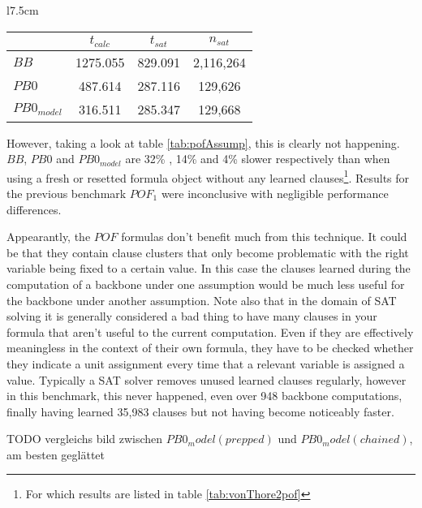 \begin{wraptable}{l}{7.5cm}
\begin{tabular}{l| c c  c}
& $t_{calc}$ & $t_{sat}$ &  $n_{sat}$ \\
\hline
$BB$ & 1275.055 & 829.091 &  2,116,264 \\
$PB0$ & 487.614 & 287.116 &  129,626 \\
$PB0_{model}$ & 316.511 & 285.347 & 129,668 \\
\end{tabular}
\caption{Results with assumptions instead of formula modification}
\label{tab:pofAssump}
\end{wraptable}

However, taking a look at table \ref{tab:pofAssump}, this is clearly not happening. $BB$, $PB0$ and $PB0_{model}$ are 32\% , 14\% and 4\% slower respectively than when using a fresh or resetted formula object without any learned clauses\footnote{For which results are listed in table \ref{tab:vonThore2pof}}. Results for the previous benchmark $POF_1$ were inconclusive with negligible performance differences.

Appearantly, the $POF$ formulas don't benefit much from this technique. It could be that they contain clause clusters that only become problematic with the right variable being fixed to a certain value. In this case the clauses learned during the computation of a backbone under one assumption would be much less useful for the backbone under another assumption. Note also that in the domain of SAT solving it is generally considered a bad thing to have many clauses in your formula that aren't useful to the current computation. Even if they are effectively meaningless in the context of their own formula, they have to be checked whether they indicate a unit assignment every time that a relevant variable is assigned a value. Typically a SAT solver removes unused learned clauses regularly, however in this benchmark, this never happened, even over 948 backbone computations, finally having learned 35,983 clauses but not having become noticeably faster.

TODO vergleichs bild zwischen $PB0_model(prepped)$ und $PB0_model(chained)$, am besten geglättet







\iffalse



